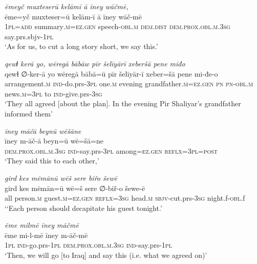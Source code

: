 \ea \label{BP.63}
\textit{ēmeyč muxteserū kelāmī ā īney wāčmē,} \\ 
\gll ēme=yč muxteser=ū kelām-ī ā īney wāč-mē \\ 
 \textsc{1pl}\textsc{=add} summary\textsc{.m}\textsc{=ez.gen} speech\textsc{-obl}\textsc{.m} \textsc{dem.dist} \textsc{dem.prox}\textsc{.obl}\textsc{.m}\textsc{.3sg} say.prs.sbjv\textsc{-\textsc{1pl}} \\ 
\glt `As for us, to cut a long story short, we say this.'
\z 
 
\ea \label{BP.65}
\textit{qewɫ kerā yo, wēregā bābāw pīr šelīyārī xeberšā pene miđo} \\ 
\gll qewɫ ∅-ker-ā yo wēregā bābā=ū pīr šelīyār-ī xeber=šā pene mi-đe-o \\ 
 arrangement\textsc{.m} \textsc{ind-}do.prs\textsc{-3pl} one\textsc{.m} evening grandfather\textsc{.m}\textsc{=ez.gen} \textsc{pn} \textsc{pn}\textsc{-obl}\textsc{.m} news\textsc{.m}\textsc{=3pl} to \textsc{ind-}give.prs\textsc{-3sg} \\ 
\glt `They all agreed [about the plan]. In the evening Pir Shaliyar’s grandfather informed them'
\z 
 
\ea \label{BP.66}
\textit{īney māčā beynū wēšāne} \\ 
\gll īney m-āč-ā beyn=ū wē=šā=ne \\ 
 \textsc{dem.prox}\textsc{.obl}\textsc{.m}\textsc{.3sg} \textsc{ind-}say.prs\textsc{-3pl} among\textsc{=ez.gen} \textsc{reflx}\textsc{=3pl}\textsc{=\textsc{post}} \\ 
\glt `They said this to each other,'
\z 
 
\ea \label{BP.67}
\textit{gird kes mēmānū wēš sere biřo šewē} \\ 
\gll gird kes mēmān=ū wē=š sere ∅-biř-o šewe-ē \\ 
 all person\textsc{.m} guest\textsc{.m}\textsc{=ez.gen} \textsc{reflx}\textsc{=3sg} head\textsc{.m} \textsc{sbjv-}cut.prs\textsc{-3sg} night.f\textsc{-obl}.f \\ 
\glt `‘Each person should decapitate his guest tonight.'
\z 
 
\ea \label{BP.68}
\textit{ēme milmē īney māčmē} \\ 
\gll ēme mi-l-mē īney m-āč-mē \\ 
 \textsc{1pl} \textsc{ind-}go.prs\textsc{-\textsc{1pl}} \textsc{dem.prox}\textsc{.obl}\textsc{.m}\textsc{.3sg} \textsc{ind-}say.prs\textsc{-\textsc{1pl}} \\ 
\glt `Then, we will go [to Iraq] and say this (i.e. what we agreed on)'
\z 
 
